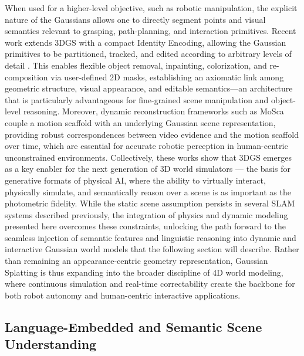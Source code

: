 \documentclass[11pt,a4paper]{article}
\begin{document}
When used for a higher-level objective, such as robotic manipulation, the explicit nature of the Gaussians allows one to directly segment points and visual semantics relevant to grasping, path-planning, and interaction primitives. Recent work extends 3DGS with a compact Identity Encoding, allowing the Gaussian primitives to be partitioned, tracked, and edited according to arbitrary levels of detail \cite{arxiv:2312.00732v1}. This enables flexible object removal, inpainting, colorization, and re-composition via user-defined 2D masks, establishing an axiomatic link among geometric structure, visual appearance, and editable semantics---an architecture that is particularly advantageous for fine-grained scene manipulation and object-level reasoning. Moreover, dynamic reconstruction frameworks such as MoSca \cite{arxiv:2405.17421v1} couple a motion scaffold with an underlying Gaussian scene representation, providing robust correspondences between video evidence and the motion scaffold over time, which are essential for accurate robotic perception in human-centric unconstrained environments. Collectively, these works show that 3DGS emerges as a key enabler for the next generation of 3D world simulators --- the basis for generative formats of physical AI, where the ability to virtually interact, physically simulate, and semantically reason over a scene is as important as the photometric fidelity. While the static scene assumption persists in several SLAM systems described previously, the integration of physics and dynamic modeling presented here overcomes these constraints, unlocking the path forward to the seamless injection of semantic features and linguistic reasoning into dynamic and interactive Gaussian world models that the following section will describe. Rather than remaining an appearance-centric geometry representation, Gaussian Splatting is thus expanding into the broader discipline of 4D world modeling, where continuous simulation and real-time correctability create the backbone for both robot autonomy and human-centric interactive applications.


\subsection{Language-Embedded and Semantic Scene Understanding}
\end{document}
